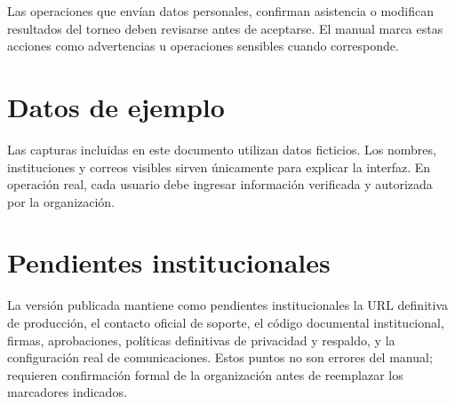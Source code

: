 \begin{advertencia}
Las operaciones que envían datos personales, confirman asistencia o modifican resultados del torneo deben revisarse antes de aceptarse. El manual marca estas acciones como advertencias u operaciones sensibles cuando corresponde.
\end{advertencia}

\section*{Datos de ejemplo}

Las capturas incluidas en este documento utilizan datos ficticios. Los nombres, instituciones y correos visibles sirven únicamente para explicar la interfaz. En operación real, cada usuario debe ingresar información verificada y autorizada por la organización.

\section*{Pendientes institucionales}

La versión publicada mantiene como pendientes institucionales la URL definitiva de producción, el contacto oficial de soporte, el código documental institucional, firmas, aprobaciones, políticas definitivas de privacidad y respaldo, y la configuración real de comunicaciones. Estos puntos no son errores del manual; requieren confirmación formal de la organización antes de reemplazar los marcadores indicados.
